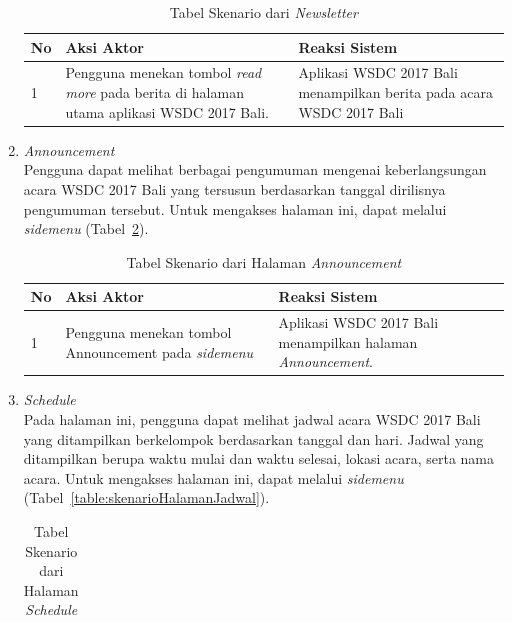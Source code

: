 \begin{enumerate}
		\begin{table}[H]
			\centering
			\caption{Tabel Skenario dari \textit{Newsletter}}
			\begin{tabular}{|p{0.5cm}|p{7cm}|p{7cm}|}
				\hline
				No & Aksi Aktor                               & Reaksi Sistem                                          \\ \hline
				1  & Pengguna menekan tombol {\it read more} pada berita di halaman utama aplikasi WSDC 2017 Bali. & Aplikasi WSDC 2017 Bali menampilkan berita pada acara WSDC 2017 Bali \\ \hline
			\end{tabular}
			\label{table:skenarioBerita}
		\end{table}
	\item \textit{Announcement} \\ 
	Pengguna dapat melihat berbagai pengumuman mengenai keberlangsungan acara WSDC 2017 Bali yang tersusun berdasarkan tanggal dirilisnya pengumuman tersebut. Untuk mengakses halaman ini, dapat melalui \textit{sidemenu} (Tabel~\ref{table:skenarioHalamanPemberitahuan}).
		\begin{table}[H]
			\centering
			\caption{Tabel Skenario dari Halaman \textit{Announcement}}
			\begin{tabular}{|p{0.5cm}|p{7cm}|p{7cm}|}
				\hline
				No & Aksi Aktor                               & Reaksi Sistem                                          \\ \hline
				1  & Pengguna menekan tombol Announcement pada \textit{sidemenu} & Aplikasi WSDC 2017 Bali menampilkan halaman \textit{Announcement}. \\ \hline
			\end{tabular}
			\label{table:skenarioHalamanPemberitahuan}
		\end{table}
	\item \textit{Schedule} \\ 
	Pada halaman ini, pengguna dapat melihat jadwal acara WSDC 2017 Bali yang ditampilkan berkelompok berdasarkan tanggal dan hari. Jadwal yang ditampilkan berupa waktu mulai dan waktu selesai, lokasi acara, serta nama acara. Untuk mengakses halaman ini, dapat melalui \textit{sidemenu} (Tabel~\ref{table:skenarioHalamanJadwal}).
		\begin{table}[H]
			\centering
			\caption{Tabel Skenario dari Halaman \textit{Schedule}}
			\begin{tabular}{|p{0.5cm}|p{7cm}|p{7cm}|}

\end{tabular}
\end{table}
\end{enumerate}
